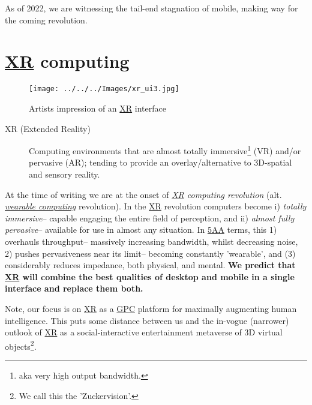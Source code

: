 \documentclass[logo,bsc,singlespacing,parskip]{infthesis}
\begin{document}
As of 2022, we are witnessing the tail-end stagnation of mobile, making way for the coming revolution.

\section{\hyperref[org53dbe83]{XR} computing}
\label{sec:orgcecf245}
\begin{figure}[h]
\centering
\texttt{[image: ../../../Images/xr\_ui3.jpg]}
\caption{Artists impression of an \hyperref[org53dbe83]{XR} interface}
\end{figure}

\begin{mdframed}
\begin{description}
\item[{\label{org53dbe83}XR (Extended Reality)}] Computing environments that are almost totally immersive\footnote{aka very high output bandwidth.} (VR) and/or pervasive (AR); tending to provide an overlay/alternative to 3D-spatial and sensory reality.
\end{description}
\end{mdframed}

At the time of writing we are at the onset of \emph{\hyperref[org53dbe83]{XR} computing revolution} (alt. \emph{\hyperref[wearable computing]{wearable computing}} revolution).
In the \hyperref[org53dbe83]{XR} revolution computers become i) \emph{totally immersive}-- capable engaging the entire field of perception, and ii) \emph{almost fully pervasive}-- available for use in almost any situation.
In \hyperref[orgce96c46]{5AA} terms, this 1) overhauls throughput-- massively increasing bandwidth, whilst decreasing noise, 2) pushes pervasiveness near its limit-- becoming constantly 'wearable', and (3) considerably reduces impedance, both physical, and mental.
\textbf{We predict that \hyperref[org53dbe83]{XR} will combine the best qualities of desktop and mobile in a single interface and replace them both.}

Note, our focus is on \hyperref[org53dbe83]{XR} as a \hyperref[orge31a644]{GPC} platform for maximally augmenting human intelligence.
This puts some distance between us and the in-vogue (narrower) outlook of \hyperref[org53dbe83]{XR} as a social-interactive entertainment metaverse of 3D virtual objects\footnote{We call this the 'Zuckervision'.}.
\end{document}
